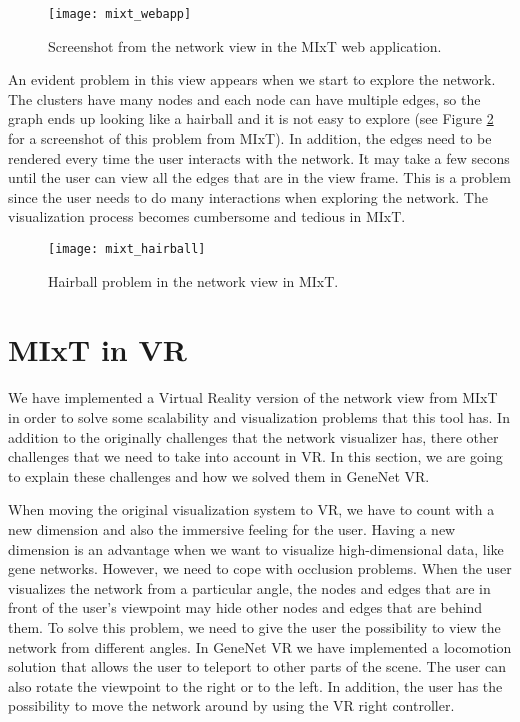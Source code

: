 \begin{figure}[h!]
    \setlength{\tempheight}{15ex}
    \centering
    \texttt{[image: mixt\_webapp]}
    \caption{Screenshot from the network view in the MIxT web application.}
    \label{fig:mixt_webapp}
\end{figure}

An evident problem in this view appears when we start to explore the network. The clusters have many nodes and each node can have multiple edges, so the graph ends up looking like a hairball and it is not easy to explore (see Figure \ref{fig:mixt_hairball} for a screenshot of this problem from MIxT). In addition, the edges need to be rendered every time the user interacts with the network. It may take a few secons until the user can view all the edges that are in the view frame. This is a problem since the user needs to do many interactions when exploring the network. The visualization process becomes cumbersome and tedious in MIxT.

\begin{figure}[h!]
    \setlength{\tempheight}{15ex}
    \centering
    \texttt{[image: mixt\_hairball]}
    \caption{Hairball problem in the network view in MIxT.}
    \label{fig:mixt_hairball}
\end{figure}

\section{MIxT in VR}
We have implemented a Virtual Reality version of the network view from MIxT in order to solve some scalability and visualization problems that this tool has. In addition to the originally challenges that the network visualizer has, there other challenges that we need to take into account in VR. In this section, we are going to explain these challenges and how we solved them in GeneNet VR.

When moving the original visualization system to VR, we have to count with a new dimension and also the immersive feeling for the user. Having a new dimension is an advantage when we want to visualize high-dimensional data, like gene networks. However, we need to cope with occlusion problems. When the user visualizes the network from a particular angle, the nodes and edges that are in front of the user's viewpoint may hide other nodes and edges that are behind them. To solve this problem, we need to give the user the possibility to view the network from different angles. In GeneNet VR we have implemented a locomotion solution that allows the user to teleport to other parts of the scene. The user can also rotate the viewpoint to the right or to the left. In addition, the user has the possibility to move the network around by using the VR right controller.

